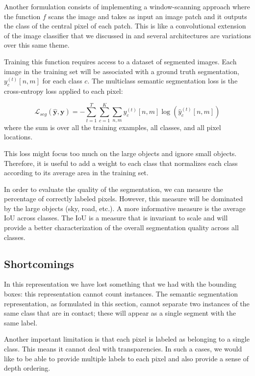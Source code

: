 Another formulation consists of implementing a window-scanning approach where the function $f$ scans the image and takes as input an image patch and it outputs the class of the central pixel of each patch. This is like a convolutional extension of the image classifier that we discussed in \sect{\ref{sec:image_classification}} and several architectures are variations over this same theme. 

Training this function requires access to a dataset of segmented images. Each image in the training set will be associated with a ground truth segmentation, $y^{(t)}_c \left[n,m \right]$ for each class $c$. The multiclass semantic segmentation loss is the cross-entropy loss applied to each pixel:

\begin{equation}
    \mathcal{L}_{seg}(\hat{\mathbf{y}},\mathbf{y})
     = -\sum_{t=1}^{T} \sum_{c=1}^{K} \sum_{n,m}  y^{(t)}_c \left[n,m \right] \log(\hat{y}^{(t)}_c \left[n,m \right])
\end{equation}
where the sum is over all the training examples, all classes, and all pixel locations. 

This loss might focus too much on the large objects and ignore small objects. Therefore, it is useful to add a weight to each class that normalizes each class according to its average area in the training set. 

In order to evaluate the quality of the segmentation, we can measure the percentage of correctly labeled pixels. However, this measure will be dominated by the large objects (sky, road, etc.). A more informative measure is the average IoU across classes. The IoU is a measure that is invariant to scale and will provide a better characterization of the overall segmentation quality across all classes. 

\subsection{Shortcomings}

In this representation we have lost something that we had with the bounding boxes: this representation cannot count instances. The semantic segmentation representation, as formulated in this section, cannot separate two instances of the same class that are in contact; these will appear as a single segment with the same label.

Another important limitation is that each pixel is labeled as belonging to a single class. This means it cannot deal with transparencies. In such a cases, we would like to be able to provide multiple labels to each pixel and also provide a sense of depth ordering. 



